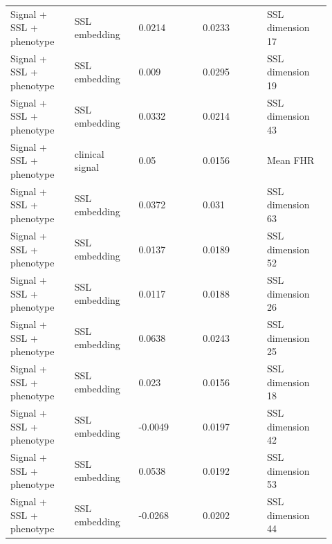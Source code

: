 \documentclass[utf8]{frontiers_suppmat}
\begin{document}
\begin{landscape}
\begin{longtable}{L{0.184\linewidth} L{0.184\linewidth} L{0.184\linewidth} L{0.184\linewidth} L{0.184\linewidth}}
Signal + SSL + phenotype & SSL embedding & 0.\allowbreak{}0214 & 0.\allowbreak{}0233 & SSL dimension 17 \\
Signal + SSL + phenotype & SSL embedding & 0.\allowbreak{}009 & 0.\allowbreak{}0295 & SSL dimension 19 \\
Signal + SSL + phenotype & SSL embedding & 0.\allowbreak{}0332 & 0.\allowbreak{}0214 & SSL dimension 43 \\
Signal + SSL + phenotype & clinical signal & 0.\allowbreak{}05 & 0.\allowbreak{}0156 & Mean FHR \\
Signal + SSL + phenotype & SSL embedding & 0.\allowbreak{}0372 & 0.\allowbreak{}031 & SSL dimension 63 \\
Signal + SSL + phenotype & SSL embedding & 0.\allowbreak{}0137 & 0.\allowbreak{}0189 & SSL dimension 52 \\
Signal + SSL + phenotype & SSL embedding & 0.\allowbreak{}0117 & 0.\allowbreak{}0188 & SSL dimension 26 \\
Signal + SSL + phenotype & SSL embedding & 0.\allowbreak{}0638 & 0.\allowbreak{}0243 & SSL dimension 25 \\
Signal + SSL + phenotype & SSL embedding & 0.\allowbreak{}023 & 0.\allowbreak{}0156 & SSL dimension 18 \\
Signal + SSL + phenotype & SSL embedding & -\allowbreak{}0.\allowbreak{}0049 & 0.\allowbreak{}0197 & SSL dimension 42 \\
Signal + SSL + phenotype & SSL embedding & 0.\allowbreak{}0538 & 0.\allowbreak{}0192 & SSL dimension 53 \\
Signal + SSL + phenotype & SSL embedding & -\allowbreak{}0.\allowbreak{}0268 & 0.\allowbreak{}0202 & SSL dimension 44 \\
\end{longtable}
\normalsize
\end{landscape}
\end{document}
